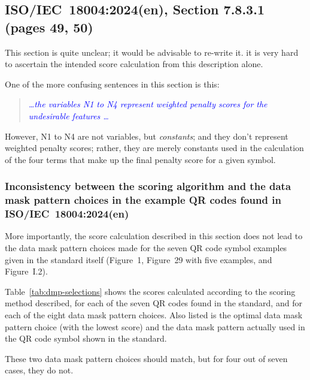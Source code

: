 \documentclass[a4paper,twoside]{article}
\newcommand{\shortstandard}{ISO/IEC~18004}
\newcommand{\standard}{\shortstandard:2024(en)}
\newcommand{\quotestandard}[1]{\textcolor{blue}{\textit{#1}}}
\newcommand{\ddd}{\dots}
\begin{document}
\subsection{\standard, Section 7.8.3.1 (pages 49, 50)}
\label{sec:dmp-scoring}

This section is quite unclear; it would be advisable to re-write it. it is very
hard to ascertain the intended score calculation from this description alone. 

One of the more confusing sentences in this section is this:

\begin{quote}
\quotestandard{\ddd the variables N1 to N4 represent weighted penalty scores for the undesirable features \ddd}
\end{quote}

However, N1 to N4 are not variables, but \emph{constants}; and they don't represent weighted penalty
scores; rather, they are merely constants used in the calculation of the four terms that make up
the final penalty score for a given symbol.

\subsubsection*{Inconsistency between the scoring algorithm and the data mask pattern choices in the example QR codes found in \standard}

More importantly, the score calculation described in this section does not lead to the data mask
pattern choices made for the seven QR code symbol examples given in the standard itself (Figure~1,
Figure~29 with five examples, and Figure~I.2).

Table~\ref{tab:dmp-selections} shows the scores calculated according to the scoring method described, for each of the seven QR codes
found in the standard, and for each of the eight data mask pattern choices. Also listed is the optimal data mask
pattern choice (with the  lowest score) and the data mask pattern actually used in the QR code symbol shown in the standard.

These two data mask pattern choices should match, but for four out of seven cases, they do not.
\end{document}
